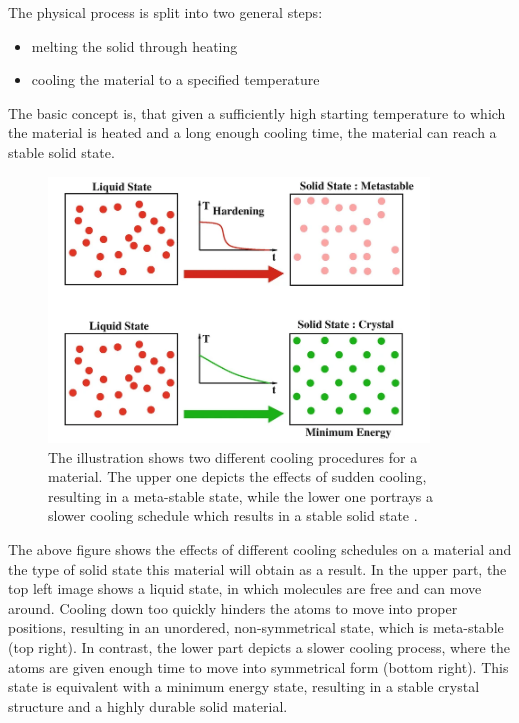The physical process is split into two general steps:
\begin{itemize}
	\item melting the solid through heating
	\item cooling the material to a specified temperature
\end{itemize}
The basic concept is, that given a sufficiently high starting temperature to which the material is heated and a long enough cooling time, the material can reach a stable solid state. 

\begin{figure}[h]
	\centering
	\includegraphics[width=0.9\textwidth]{bilder/AnnealingIllustration.png}
	\caption{The illustration shows two different cooling procedures for a material. The upper one depicts the effects of sudden cooling, resulting in a meta-stable state, while the lower one portrays a slower cooling schedule which results in a stable solid state \cite{delahaye_simulated_2019}.}
	\label{fig:annealingIllustration}
\end{figure}


The above figure shows the effects of different cooling schedules on a material and the type of solid state this material will obtain as a result.
In the upper part, the top left image shows a liquid state, in which molecules are free and can move around.
Cooling down too quickly hinders the atoms to move into proper positions, resulting in an unordered, non-symmetrical state, which is meta-stable (top right).
In contrast, the lower part depicts a slower cooling process, where the atoms are given enough time to move into symmetrical form (bottom right).
This state is equivalent with a minimum energy state, resulting in a stable crystal structure and a highly durable solid material. 

